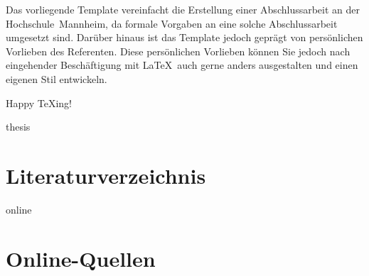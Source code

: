 \documentclass[11pt,a4paper]{report}
\begin{document}
Das vorliegende Template vereinfacht die Erstellung einer
Abschlussarbeit an der Hochschule~Mannheim, da formale
Vorgaben an eine solche Abschlussarbeit umgesetzt sind. 
Darüber hinaus ist das Template jedoch geprägt von persönlichen
Vorlieben des Referenten. 
Diese persönlichen Vorlieben können Sie jedoch nach eingehender
Beschäftigung mit \LaTeX\ auch gerne anders ausgestalten und
einen eigenen Stil entwickeln.

Happy \TeX ing! 

\newpage


\begin{btSect}{thesis} %
\section*{Literaturverzeichnis}
\btPrintCited
\end{btSect}
\begin{btSect}{online}
\section*{Online-Quellen}
\btPrintCited
\end{btSect}
\end{document}
